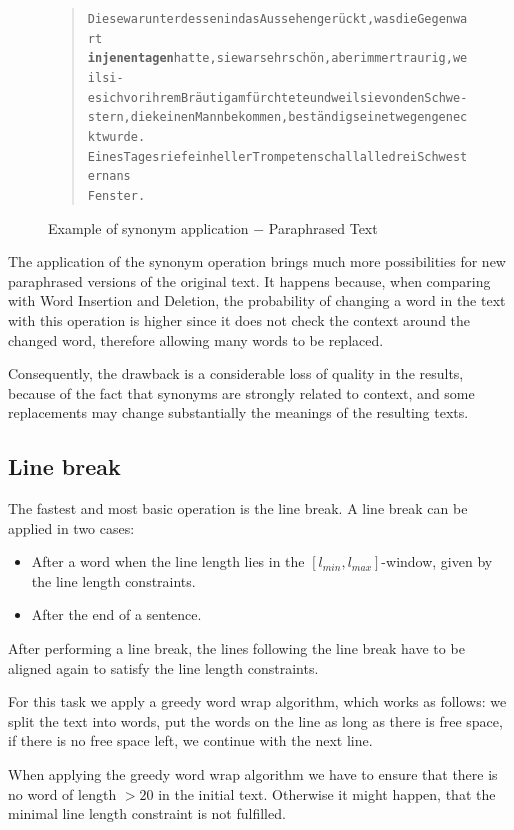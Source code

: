\documentclass[11pt]{reportAlternative}
\begin{document}
\begin{figure}[H]
\begin{quote}
\begin{alltt}
Diese war unterdessen in das Aussehen gerückt, was die Gegenwart
\textbf{in jenen tagen} hatte, sie war sehr schön, aber immer traurig, weil si-
e sich vor ihrem Bräutigam fürchtete und weil sie von den Schwe-
stern, die keinen Mann bekommen, beständig seinetwegen geneckt wurde.
Eines Tages rief ein heller Trompetenschall alle drei Schwestern ans
Fenster.
\end{alltt}
\end{quote}
\caption{Example of synonym application $-$ Paraphrased Text}
\end{figure}

The application of the synonym operation brings much more possibilities for new paraphrased versions of the original text. It happens because, when comparing with Word Insertion and Deletion, the probability of changing a word in the text with this operation is higher since it does not check the context around the changed word, therefore allowing many words to be replaced.

Consequently, the drawback is a considerable loss of quality in the results, because of the fact that synonyms are strongly related to context, and some replacements may change substantially the meanings of the resulting texts.

\subsection{Line break}
The fastest and most basic operation is the line break. A line break can be applied in two cases:

\begin{itemize}
	\item After a word when the line length lies in the $[l_{min},l_{max}]$-window,
	given by the line length constraints.
	\item After the end of a sentence.
\end{itemize}
After performing a line break, the lines following the line break have
to be aligned again to satisfy the line length constraints.

For this task we apply a greedy word wrap algorithm, which works as follows: we split the text into words,
put the words on the line as long as there is free space, if there is no free space left, we continue with the next line.

When applying the greedy word wrap algorithm we have to ensure that
there is no word of length $> 20$ in the initial text. Otherwise it might happen, that the minimal line
length constraint is not fulfilled.
\end{document}
